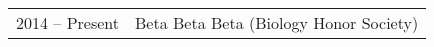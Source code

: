 \documentclass[a4paper,10pt]{article}
\begin{document}
\section{\color{linkcolour}{Professional Affiliations}}
\begin{tabular}{rl}
2014 -- Present & Beta Beta Beta (Biology Honor Society) \\
\end{tabular}
\end{document}
